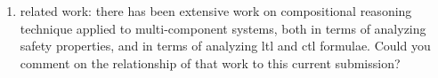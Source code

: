 \begin{enumerate}

\item  related work: there has been extensive work on compositional reasoning
technique applied to multi-component systems, both in terms of analyzing
safety properties, and in terms of analyzing ltl and ctl formulae. 
Could you comment
on the relationship of that work to this current submission?


\end{enumerate}




